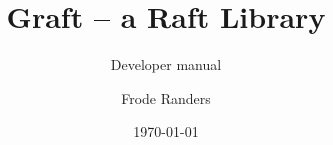\documentclass{techdoc}
\date{\today}
\title{Graft -- a Raft Library}
\subtitle{Developer manual}
\author{Frode Randers}
\begin{document}
    \rhead{}

    \maketitle

    \vfill

    \newpage
    \renewcommand\contentsname{Contents}
    \tableofcontents
    \newpage

    
    \newpage

    
    \newpage

    
    \newpage

    
    \newpage

    
    \newpage

    
    \newpage

    
    \newpage

    
    \newpage

    
    \newpage

    
    \newpage

    
    \newpage

    
    \newpage

    
    \newpage

    
    \newpage
\end{document}
